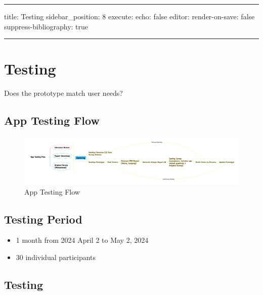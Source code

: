 \documentclass[
  letterpaper,
  DIV=11,
  numbers=noendperiod]{scrartcl}
\providecommand{\tightlist}{%
  \setlength{\itemsep}{0pt}\setlength{\parskip}{0pt}}\usepackage{longtable,booktabs,array}
\begin{document}
\begin{center}\rule{0.5\linewidth}{0.5pt}\end{center}

title: Testing sidebar\_position: 8 execute: echo: false editor:
render-on-save: false suppress-bibliography: true

\begin{center}\rule{0.5\linewidth}{0.5pt}\end{center}

\section{Testing}\label{testing-1}

Does the prototype match user needs?

\subsection{App Testing Flow}\label{app-testing-flow}

\begin{figure}[H]

{\centering \includegraphics[width=1\textwidth,height=\textheight]{./images/app-testing-flow.png}

}

\caption{App Testing Flow}

\end{figure}%

\subsection{Testing Period}\label{testing-period}

\begin{itemize}
\tightlist
\item
  1 month from 2024 April 2 to May 2, 2024
\item
  30 individual participants
\end{itemize}

\subsection{Testing}\label{testing-2}
\end{document}
